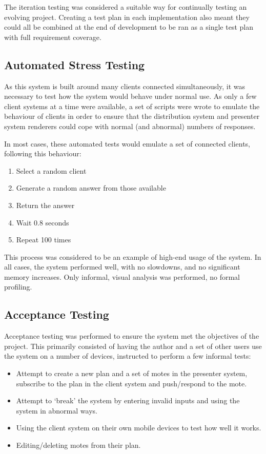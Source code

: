 \documentclass[a4papert,11pt,notitlepage]{article}
\begin{document}
The iteration testing was considered a suitable way for continually testing an evolving project. Creating a test plan in each implementation also meant they could all be combined at the end of development to be ran as a single test plan with full requirement coverage.

\subsection{Automated Stress Testing}
As this system is built around many clients connected simultaneously, it was necessary to test how the system would behave under normal use. As only a few client systems at a time were available, a set of scripts were wrote to emulate the behaviour of clients in order to ensure that the distribution system and presenter system renderers could cope with normal (and abnormal) numbers of responses.

In most cases, these automated tests would emulate a set of connected clients, following this behaviour:
\begin{enumerate}
\item Select a random client
\item Generate a random answer from those available
\item Return the answer
\item Wait 0.8 seconds
\item Repeat 100 times
\end{enumerate}

This process was considered to be an example of high-end usage of the system. In all cases, the system performed well, with no slowdowns, and no significant memory increases. Only informal, visual analysis was performed, no formal profiling.

\subsection{Acceptance Testing}
Acceptance testing was performed to ensure the system met the objectives of the project. This primarily consisted of having the author and a set of other users use the system on a number of devices, instructed to perform a few informal tests:
\begin{itemize}
\item Attempt to create a new plan and a set of motes in the presenter system, subscribe to the plan in the client system and push/respond to the mote.
\item Attempt to `break' the system by entering invalid inputs and using the system in abnormal ways.
\item Using the client system on their own mobile devices to test how well it works.
\item Editing/deleting motes from their plan.
\end{itemize}
\end{document}
